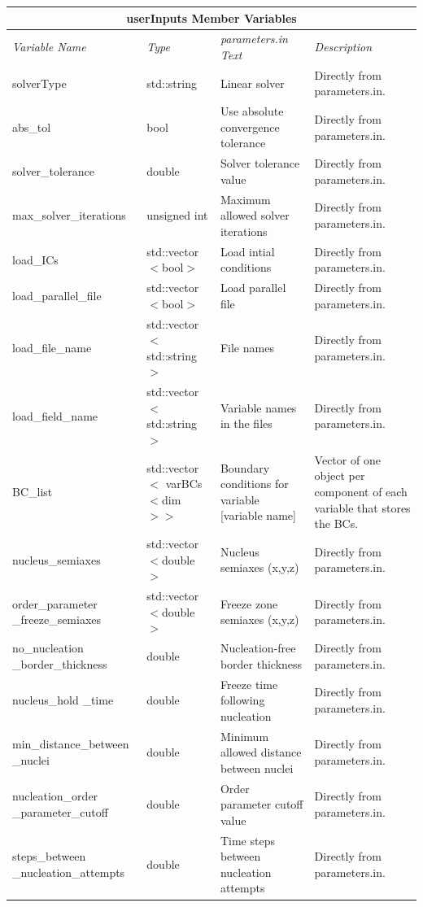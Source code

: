 \documentclass[10pt]{article} %
\begin{document}
\begin{center}
    \begin{tabular}{ | p{} | p{} |p{} | p{} |}
    \hline
      \multicolumn{4}{|c|}{\textbf{userInputs Member Variables}} \\
    \hline
    \hline
    \emph{Variable Name} & \emph{Type} & \emph{parameters.in Text} & \emph{Description} \\ \hline
           solverType & std::string & Linear solver & Directly from parameters.in. \\ \hline
           abs\_tol & bool & Use absolute convergence tolerance & Directly from parameters.in. \\ \hline
           solver\_tolerance & double & Solver tolerance value & Directly from parameters.in. \\ \hline
           max\_solver\_iterations & unsigned int & Maximum allowed solver iterations & Directly from parameters.in. \\ \hline
            load\_ICs & std::vector$<$bool$>$ & Load intial conditions & Directly from parameters.in. \\ \hline
             load\_parallel\_file & std::vector$<$bool$>$ & Load parallel file & Directly from parameters.in. \\ \hline
              load\_file\_name & std::vector$<$std::string$>$ & File names & Directly from parameters.in. \\ \hline
              load\_field\_name & std::vector$<$std::string$>$ & Variable names in the files & Directly from parameters.in. \\ \hline
          BC\_list & std::vector$<$ varBCs$<$dim$>>$ &  Boundary conditions for variable [variable name] & Vector of one object per component of each variable that stores the BCs. \\ \hline
          nucleus\_semiaxes & std::vector$<$double$>$ & Nucleus semiaxes (x,y,z) & Directly from parameters.in. \\ \hline
          order\_parameter \_freeze\_semiaxes & std::vector$<$double$>$ & Freeze zone semiaxes (x,y,z) & Directly from parameters.in. \\ \hline
          no\_nucleation \_border\_thickness & double & Nucleation-free border thickness & Directly from parameters.in. \\ \hline
          nucleus\_hold \_time & double & Freeze time following nucleation & Directly from parameters.in. \\ \hline
           min\_distance\_between \_nuclei & double & Minimum allowed distance between nuclei & Directly from parameters.in. \\ \hline
           nucleation\_order \_parameter\_cutoff & double & Order parameter cutoff value & Directly from parameters.in. \\ \hline
            steps\_between \_nucleation\_attempts & double & Time steps between nucleation attempts & Directly from parameters.in. \\ \hline
               \end{tabular}
\end{center}
\end{document}
